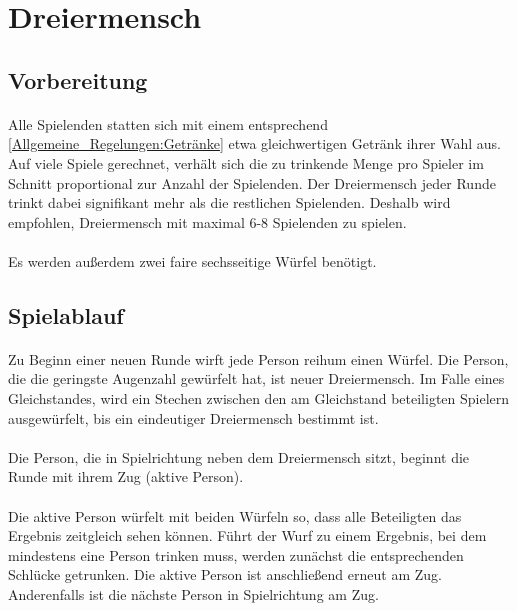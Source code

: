 \section{Dreiermensch}

\subsection{Vorbereitung}
\paragraph{}
Alle Spielenden statten sich mit einem entsprechend \ref{Allgemeine_Regelungen:Getränke} etwa gleichwertigen Getränk ihrer Wahl aus.
Auf viele Spiele gerechnet, verhält sich die zu trinkende Menge pro Spieler im Schnitt proportional zur Anzahl der Spielenden.
Der Dreiermensch jeder Runde trinkt dabei signifikant mehr als die restlichen Spielenden.
Deshalb wird empfohlen, Dreiermensch mit maximal 6-8 Spielenden zu spielen.

\paragraph{}
Es werden außerdem zwei faire sechsseitige Würfel benötigt.


\subsection{Spielablauf}
\paragraph{} \label{Dreiermensch:Spielablauf:NeueRunde}
Zu Beginn einer neuen Runde wirft jede Person reihum einen Würfel.
Die Person, die die geringste Augenzahl gewürfelt hat, ist neuer Dreiermensch.
Im Falle eines Gleichstandes, wird ein Stechen zwischen den am Gleichstand beteiligten Spielern ausgewürfelt, bis ein eindeutiger Dreiermensch bestimmt ist.

\paragraph{}
Die Person, die in Spielrichtung neben dem Dreiermensch sitzt, beginnt die Runde mit ihrem Zug (\glqq aktive Person\grqq{}).

\paragraph{}
Die aktive Person würfelt mit beiden Würfeln so, dass alle Beteiligten das Ergebnis zeitgleich sehen können.
Führt der Wurf zu einem Ergebnis, bei dem mindestens eine Person trinken muss, werden zunächst die entsprechenden Schlücke getrunken.
Die aktive Person ist anschließend erneut am Zug.
Anderenfalls ist die nächste Person in Spielrichtung am Zug.

